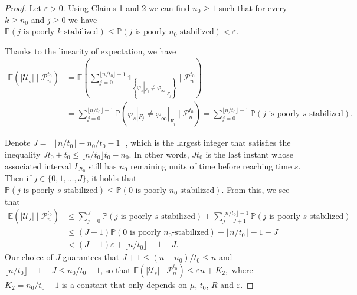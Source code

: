 \documentclass[reqno,oneside,11pt]{amsart}
\renewcommand{\P}{\mathbb{P}}
\newcommand{\E}{\mathbb{E}}
\theoremstyle{plain}
\theoremstyle{definition}
\begin{document}
\begin{proof}
	Let $\varepsilon>0$. Using Claims 1 and 2 we can find $n_0\ge 1$ such that for every $k\ge n_0$ and $j\ge 0$ we have $
		\P(j \text{ is poorly }k\text{-stabilized})\le \P(j \text{ is poorly }n_0\text{-stabilized})<\varepsilon.$
	
	Thanks to the linearity of expectation, we have
	\begin{align*}
		\E\left(|\mathcal{U}_s| \mid \mathcal{P}_n^{t_0}\right)&= 
		\E\left(\sum_{j=0}^{\lfloor n/t_0\rfloor-1}\mathds{1}_{\left\{\varphi_s|_{F_j}\neq \varphi_{\infty}|_{F_j}\right \}} \mid \mathcal{P}_n^{t_0}\right)\\
		&=
		\sum_{j=0}^{\lfloor n/t_0\rfloor-1}\P\left(\varphi_s|_{F_j}\neq \varphi_{\infty}|_{F_j}\mid \mathcal{P}_n^{t_0}\right)=\sum_{j=0}^{\lfloor n/t_0\rfloor-1} \P(j\text{ is poorly }s\text{-stabilized}).
	\end{align*}
	
	Denote $J=\left \lfloor \lfloor n/t_0 \rfloor- n_0/t_0-1  \right \rfloor$, which is the largest integer that satisfies the inequality $Jt_0+t_0\le \lfloor n/t_0 \rfloor t_0 - n_0$. In other words, $Jt_0$ is the last instant whose associated interval $I_{Jt_0}$ still has $n_0$ remaining units of time before reaching time $s$. Then if $j\in \{0,1,\ldots, J\}$, it holds that $  \P(j\text{ is poorly }s\text{-stabilized})\le \P(0\text{ is poorly }n_0\text{-stabilized}).$ From this, we see that
	\begin{align*}
		\E\left(|\mathcal{U}_s| \mid \mathcal{P}_n^{t_0}\right)&\le\sum_{j=0}^{J} \P(j\text{ is poorly }s\text{-stabilized})+\sum_{j=J+1}^{\lfloor n/t_0\rfloor-1}\P(j\text{ is poorly }s\text{-stabilized})\\
		&\le (J+1) \P(0\text{ is poorly }n_0\text{-stabilized})+ \lfloor n/t_0\rfloor-1 -J \\
		&< (J+1)\varepsilon +\lfloor n/t_0\rfloor-1 -J.
	\end{align*}
	Our choice of $J$ guarantees that $J+1\le (n-n_0)/t_0\le n$ and $\lfloor n/t_0\rfloor-1 -J\le n_0/t_0+1$, so that $
		\E\left(|\mathcal{U}_s| \mid \mathcal{P}_n^{t_0}\right)\le \varepsilon n + K_2,$ where $K_2=n_0/t_0+1$ is a constant that only depends on $\mu$, $t_0$, $R$ and $\varepsilon$.
\end{proof}
\end{document}
